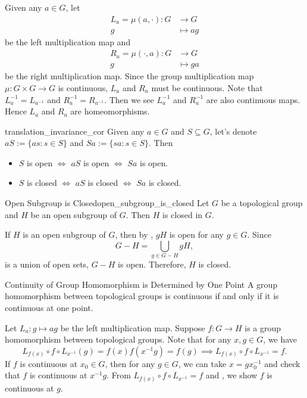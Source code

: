 \documentclass{report}
\begin{document}
\begin{prf}
	Given any $a\in G$, let
	\begin{align*}
		L_a=\mu(a,\cdot):G & \longrightarrow G \\
		g                  & \longmapsto ag
	\end{align*}
	be the left multiplication map and
	\begin{align*}
		R_a=\mu(\cdot,a):G & \longrightarrow G \\
		g                  & \longmapsto ga
	\end{align*}
	be the right multiplication map. Since the group multiplication map $\mu:G\times G\to G$ is continuous, $L_a$ and $R_a$ must be continuous. Note that $L_a^{-1}=L_{a^{-1}}$ and $R_a^{-1}=R_{a^{-1}}$. Then we see $L_a^{-1}$ and $R_a^{-1}$ are also continuous maps. Hence $L_a$ and $R_a$ are homeomorphisms.
\end{prf}


\begin{corollary}{}{translation_invariance_cor}
	Given any $a \in G$ and $S \subseteq G$, let's denote $a S:=\{a s: s \in S\}$ and $S a:=\{s a: s \in S\}$. Then
	\begin{itemize}
		\item $S$ is open $\iff$ $a S$ is open $\iff$ $S a$ is open.
		\item $S$ is closed $\iff$ $a S$ is closed $\iff$ $Sa$ is closed.
	\end{itemize}
\end{corollary}

\begin{proposition}{Open Subgroup is Closed}{open_subgroup_is_closed}
	Let $G$ be a topological group and $H$ be an open subgroup of $G$. Then $H$ is closed in $G$.
\end{proposition}
\begin{prf}
	If $H$ is an open subgroup of $G$, then	by , $gH$ is open for any $g\in G$. 
	Since
	\[
	G-H=\bigcup_{g\in G-H} gH,
	\]
	is a union of open sets, $G-H$ is open. Therefore, $H$ is closed.
\end{prf}

\begin{proposition}{Continuity of Group Homomorphism is Determined by One Point}{}
	A group homomorphism between topological groups is continuous if and only if it is continuous at one point.
\end{proposition}
\begin{prf}
	Let $L_a: g\mapsto ag$ be the left multiplication map. Suppose $f:G\to H$ is a group homomorphism between topological groups. Note that for any $x,g\in G$, we have 
	\[
	 L_{f(x)}\circ f\circ L_{x^{-1}}(g)=f(x)f(x^{-1}g)=f(g)\implies L_{f(x)}\circ f\circ L_{x^{-1}}=f.
	\]
	If $f$ is continuous at $x_0 \in G$, then for any $g\in G$, we can take $x=gx_0^{-1}$ and check that $f$ is continuous at $x^{-1}g$. From $L_{f(x)}\circ f\circ L_{x^{-1}}=f$ and , we show $f$ is continuous at $g$. 
\end{prf}
\end{document}
